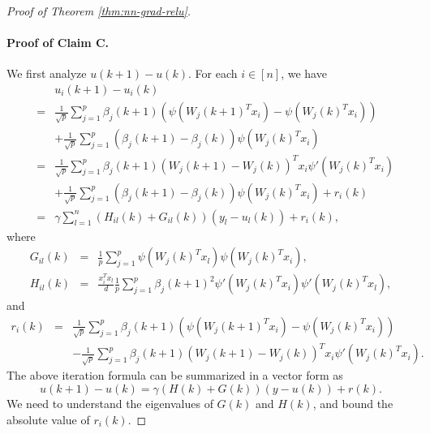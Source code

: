 \begin{proof}[Proof of Theorem \ref{thm:nn-grad-relu}]
\paragraph{Proof of Claim C.} We first analyze $u(k+1)-u(k)$. For each $i\in[n]$, we have
\begin{eqnarray*}
&& u_i(k+1) - u_i(k) \\
&=& \frac{1}{\sqrt{p}}\sum_{j=1}^p\beta_j(k+1)\left(\psi(W_j(k+1)^Tx_i)-\psi(W_j(k)^Tx_i)\right) \\
&& + \frac{1}{\sqrt{p}}\sum_{j=1}^p(\beta_j(k+1)-\beta_j(k))\psi(W_j(k)^Tx_i) \\
&=& \frac{1}{\sqrt{p}}\sum_{j=1}^p\beta_j(k+1)(W_j(k+1)-W_j(k))^Tx_i\psi'(W_j(k)^Tx_i) \\
&& + \frac{1}{\sqrt{p}}\sum_{j=1}^p(\beta_j(k+1)-\beta_j(k))\psi(W_j(k)^Tx_i) + r_i(k) \\
&=& \gamma\sum_{l=1}^n(H_{il}(k)+G_{il}(k))(y_l-u_l(k)) + r_i(k),
\end{eqnarray*}
where
\begin{eqnarray*}
G_{il}(k) &=& \frac{1}{p}\sum_{j=1}^p\psi(W_j(k)^Tx_l)\psi(W_j(k)^Tx_i), \\
H_{il}(k) &=& \frac{x_i^Tx_l}{d}\frac{1}{p}\sum_{j=1}^p\beta_j(k+1)^2\psi'(W_j(k)^Tx_i)\psi'(W_j(k)^Tx_l),
\end{eqnarray*}
and
\begin{eqnarray*}
r_i(k) &=& \frac{1}{\sqrt{p}}\sum_{j=1}^p\beta_j(k+1)\left(\psi(W_j(k+1)^Tx_i)-\psi(W_j(k)^Tx_i)\right) \\
&& - \frac{1}{\sqrt{p}}\sum_{j=1}^p\beta_j(k+1)(W_j(k+1)-W_j(k))^Tx_i\psi'(W_j(k)^Tx_i).
\end{eqnarray*}
The above iteration formula can be summarized in a vector form as
\begin{equation}
u(k+1)-u(k)=\gamma(H(k)+G(k))(y-u(k))+r(k). \label{eq:iter-u-relu}
\end{equation}
We need to understand the eigenvalues of $G(k)$ and $H(k)$, and bound the absolute value of $r_i(k)$.


\end{proof}
